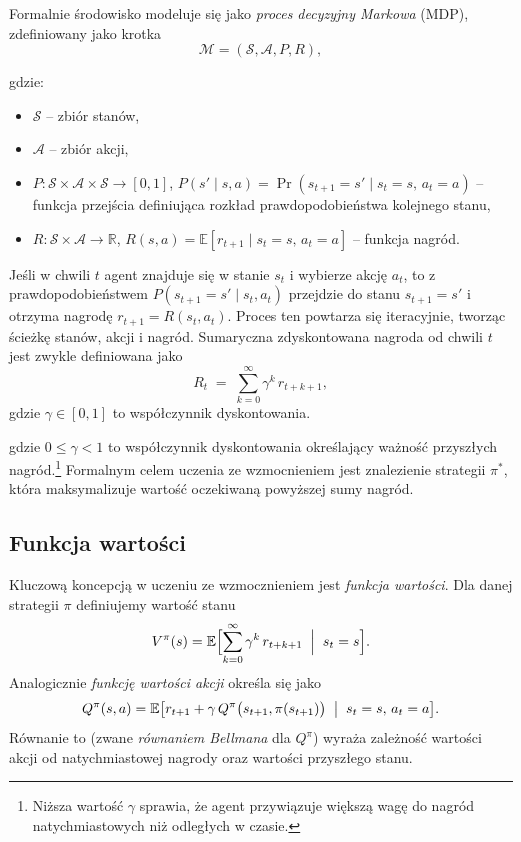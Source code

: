 \documentclass[a4paper,12pt]{article}
\begin{document}
Formalnie środowisko modeluje się jako \emph{proces decyzyjny Markowa} (MDP), zdefiniowany jako krotka
\begin{equation}
\mathcal{M} = (\mathcal{S}, \mathcal{A}, P, R),
\end{equation}

gdzie:
\begin{itemize}
  \item $\mathcal{S}$ – zbiór stanów,
  \item $\mathcal{A}$ – zbiór akcji,
  \item $P: \mathcal{S}\times\mathcal{A}\times\mathcal{S}\to[0,1]$, \quad
        $P(s' \mid s,a)=\Pr(s_{t+1}=s'\mid s_t=s,\,a_t=a)$ – funkcja przejścia definiująca rozkład prawdopodobieństwa kolejnego stanu,
  \item $R: \mathcal{S}\times\mathcal{A}\to\mathbb{R}$, \quad
        $R(s,a)=\mathbb{E}[r_{t+1}\mid s_t=s,\,a_t=a]$ – funkcja nagród.
\end{itemize}

Jeśli w chwili $t$ agent znajduje się w stanie $s_t$ i wybierze akcję $a_t$, to z prawdopodobieństwem 
$P(s_{t+1}=s'\mid s_t,a_t)$ przejdzie do stanu $s_{t+1}=s'$ i otrzyma nagrodę 
$r_{t+1}=R(s_t,a_t)$. Proces ten powtarza się iteracyjnie, tworząc ścieżkę stanów, akcji i nagród. 
Sumaryczna zdyskontowana nagroda od chwili $t$ jest zwykle definiowana jako
\begin{equation}
R_t \;=\; \sum_{k=0}^{\infty} \gamma^k\,r_{t+k+1},
\end{equation}
gdzie $\gamma\in[0,1]$ to współczynnik dyskontowania.

gdzie \(0 \le \gamma < 1\) to współczynnik dyskontowania określający ważność przyszłych nagród.\footnote{Niższa wartość \(\gamma\) sprawia, że agent przywiązuje większą wagę do nagród natychmiastowych niż odległych w czasie.} Formalnym celem uczenia ze wzmocnieniem jest znalezienie strategii \(\pi^*\), która maksymalizuje wartość oczekiwaną powyższej sumy nagród.

\subsection*{Funkcja wartości}
Kluczową koncepcją w uczeniu ze wzmocznieniem jest \emph{funkcja wartości}. Dla danej strategii \(\pi\) definiujemy wartość stanu
\begin{equation}
V^{\pi}(s)
= \mathbb{E}\Bigl[\sum_{k=0}^\infty \gamma^k\,r_{t+k+1}\;\Bigm|\;s_t=s\Bigr].
\end{equation}
Analogicznie \emph{funkcję wartości akcji} określa się jako
\begin{equation}
Q^{\pi}(s,a)
= \mathbb{E}\bigl[r_{t+1} + \gamma\,Q^{\pi}\bigl(s_{t+1},\pi(s_{t+1})\bigr)\;\bigm|\;s_t=s,\,a_t=a\bigr].
\end{equation}
Równanie to (zwane \emph{równaniem Bellmana} dla \(Q^\pi\)) wyraża zależność wartości akcji od natychmiastowej nagrody oraz wartości przyszłego stanu. 
\end{document}
